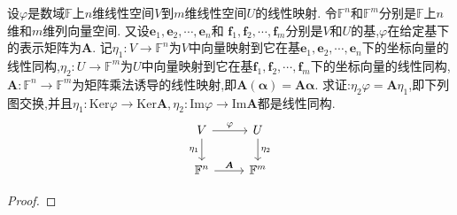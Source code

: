 \documentclass[lang=cn,newtx,10pt,scheme=chinese]{elegantbook}
\begin{document}
\begin{theorem}\label{theorem:线性映射与矩阵基本定理}
设\(\varphi\)是数域\(\mathbb{F}\)上\(n\)维线性空间\(V\)到\(m\)维线性空间\(U\)的线性映射. 令\(\mathbb{F}^n\)和\(\mathbb{F}^m\)分别是\(\mathbb{F}\)上\(n\)维和\(m\)维列向量空间. 又设\(\boldsymbol{e}_1,\boldsymbol{e}_2,\cdots,\boldsymbol{e}_n\)和
\(\boldsymbol{f}_1,\boldsymbol{f}_2,\cdots,\boldsymbol{f}_m\)分别是\(V\)和\(U\)的基,\(\varphi\)在给定基下的表示矩阵为\(\boldsymbol{A}\). 记\(\eta_1:V\to\mathbb{F}^n\)为\(V\)中向量映射到它在基\(\boldsymbol{e}_1,\boldsymbol{e}_2,\cdots,\boldsymbol{e}_n\)下的坐标向量的线性同构,\(\eta_2:U\to\mathbb{F}^m\)为\(U\)中向量映射到它在基\(\boldsymbol{f}_1,\boldsymbol{f}_2,\cdots,\boldsymbol{f}_m\)下的坐标向量的线性同构,\(\boldsymbol{A}:\mathbb{F}^n\to\mathbb{F}^m\)为矩阵乘法诱导的线性映射,即\(\boldsymbol{A}(\boldsymbol{\alpha})=\boldsymbol{A}\boldsymbol{\alpha}\). 求证:\(\eta_2\varphi=\boldsymbol{A}\eta_1\),即下列图交换,并且\(\eta_1:\text{Ker}\varphi\to\text{Ker}\boldsymbol{A},\eta_2:\text{Im}\varphi\to\text{Im}\boldsymbol{A}\)都是线性同构.
\[\begin{tikzcd}
V \arrow[r, "\varphi"] \arrow[d, "\eta_1"'] & U \arrow[d, "\eta_2"] \\
\mathbb{F}^n \arrow[r, "\boldsymbol{A}"]    & \mathbb{F}^m         
\end{tikzcd}
\]
\end{theorem}
\begin{proof}

\end{proof}
\end{document}
